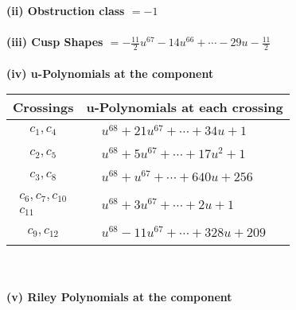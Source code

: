 \documentclass[1p]{elsarticle_modified}
\theoremstyle{definition}
\begin{document}
\flushleft \textbf{(ii) Obstruction class $= -1$}\\~\\
\flushleft \textbf{(iii) Cusp Shapes $= -\frac{11}{2} u^{67}-14 u^{66}+\cdots-29 u-\frac{11}{2}$}\\~\\
\newpage\renewcommand{\arraystretch}{1}
\flushleft \textbf{(iv) u-Polynomials at the component}\newline \\
\begin{tabular}{m{50pt}|m{274pt}}
Crossings & \hspace{64pt}u-Polynomials at each crossing \\
\hline $$\begin{aligned}c_{1},c_{4}\end{aligned}$$&$\begin{aligned}
&u^{68}+21 u^{67}+\cdots+34 u+1
\end{aligned}$\\
\hline $$\begin{aligned}c_{2},c_{5}\end{aligned}$$&$\begin{aligned}
&u^{68}+5 u^{67}+\cdots+17 u^2+1
\end{aligned}$\\
\hline $$\begin{aligned}c_{3},c_{8}\end{aligned}$$&$\begin{aligned}
&u^{68}+u^{67}+\cdots+640 u+256
\end{aligned}$\\
\hline $$\begin{aligned}c_{6},c_{7},c_{10}\\c_{11}\end{aligned}$$&$\begin{aligned}
&u^{68}+3 u^{67}+\cdots+2 u+1
\end{aligned}$\\
\hline $$\begin{aligned}c_{9},c_{12}\end{aligned}$$&$\begin{aligned}
&u^{68}-11 u^{67}+\cdots+328 u+209
\end{aligned}$\\
\hline
\end{tabular}\\~\\
\newpage\renewcommand{\arraystretch}{1}
\flushleft \textbf{(v) Riley Polynomials at the component}\newline \\
\end{document}
